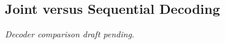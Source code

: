 \subsection{Joint versus Sequential Decoding}
\label{sec:joint-vs-sequential}
\textit{Decoder comparison draft pending.}
